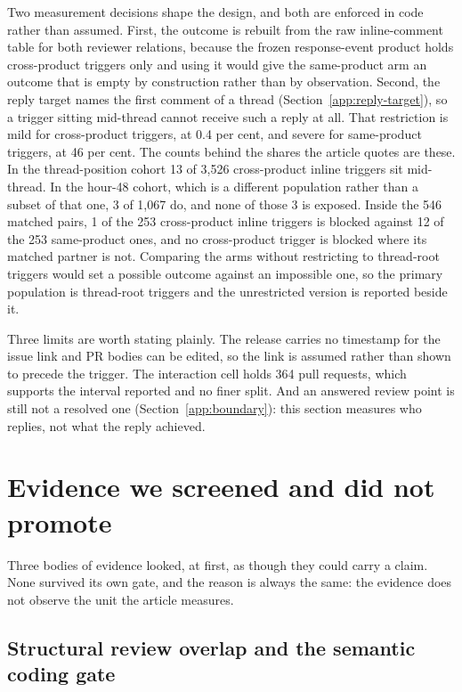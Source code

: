 \documentclass[pdflatex,sn-basic]{sn-jnl}
\begin{document}
Two measurement decisions shape the design, and both are enforced in code rather
than assumed. First, the outcome is rebuilt from the raw inline-comment table
for both reviewer relations, because the frozen response-event product holds
cross-product triggers only and using it would give the same-product arm an
outcome that is empty by construction rather than by observation. Second, the
reply target names the first comment of a thread
(Section~\ref{app:reply-target}), so a trigger sitting mid-thread cannot receive
such a reply at all. That restriction is mild for cross-product triggers, at
0.4 per cent, and severe for same-product triggers, at 46 per cent. The counts
behind the shares the article quotes are these. In the thread-position cohort 13
of 3,526 cross-product inline triggers sit mid-thread. In the hour-48 cohort,
which is a different population rather than a subset of that one, 3 of 1,067 do,
and none of those 3 is exposed. Inside the 546 matched pairs, 1 of the 253
cross-product inline triggers is blocked against 12 of the 253 same-product ones,
and no cross-product trigger is blocked where its matched partner is not.
Comparing
the arms without restricting to thread-root triggers would set a possible
outcome against an impossible one, so the primary population is thread-root
triggers and the unrestricted version is reported beside it.

Three limits are worth stating plainly. The release carries no timestamp for the
issue link and PR bodies can be edited, so the link is assumed rather than shown
to precede the trigger. The interaction cell holds 364 pull requests, which
supports the interval reported and no finer split. And an answered review point
is still not a resolved one (Section~\ref{app:boundary}): this section measures
who replies, not what the reply achieved.



\section{Evidence we screened and did not promote}\label{app:screened}

Three bodies of evidence looked, at first, as though they could carry a claim.
None survived its own gate, and the reason is always the same: the evidence does
not observe the unit the article measures.

\subsection{Structural review overlap and the semantic coding gate}\label{app:collision}
\end{document}
